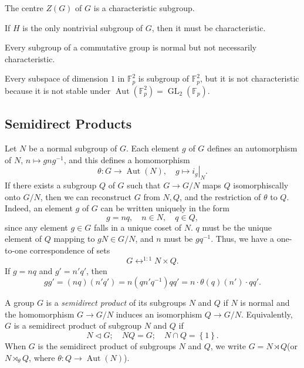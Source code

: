 \begin{example}
  \label{example-centre-is-characteristic}
  The centre \( Z(G) \) of \( G \) is a characteristic subgroup.
\end{example}

\begin{example}
  \label{example-only-nontrivial-is-characteristic}
  If \( H \) is the only nontrivial subgroup of \( G \), then it must be characteristic.
\end{example}

Every subgroup of a commutative group is normal but not necessarily characteristic.
\begin{example}
  \label{example-normal-but-not-characteristic}
  Every subspace of dimension \( 1 \) in \( \mathbb{F}^2_p \) is subgroup of \( \mathbb{F}_p^2 \), but it is not characteristic because it is not stable under \( \operatorname{Aut}(\mathbb{F}^2_p) = \operatorname{GL}_2(\mathbb{F}_p) \).
\end{example}

\subsection{Semidirect Products}
\label{subsection-semidirect-products}

Let \( N \) be a normal subgroup of \( G \).
Each element \( g \) of \( G \) defines an automorphism of \( N \), \( n \mapsto g n g^{-1} \), and this defines a homomorphism
\[
  \theta: G \to \operatorname{Aut}(N),\quad g \mapsto \left. i_g \right\vert_N.
\]
If there exists a subgroup \( Q \) of \( G \) such that \( G \to G / N \) maps \( Q \) isomorphiscally onto \( G / N \), then we can reconstruct \( G \) from \( N, Q \), and the restriction of \( \theta \) to \( Q \).
Indeed, an element \( g \) of \( G \) can be written uniquely in the form
\[
  g = nq,\quad n \in N,\quad q \in Q,
\]
since any element \( g \in G \) falls in a unique coset of \( N \).
\( q \) must be the unique element of \( Q \) mapping to \( gN \in G / N \), and \( n \) must be \( gq^{-1} \).
Thus, we have a one-to-one correspondence of sets
\[
  G \mathop{\longleftrightarrow}^{1:1} N \times Q.
\]
If \( g = nq \) and \( g' = n'q' \), then
\[
  gg' = (nq)(n'q') = n(qn'q^{-1})qq' = n \cdot \theta(q)(n') \cdot qq'.
\]
\begin{definition}
  \label{definition-semidirect-product}
  A group \( G \) is a \emph{semidirect product} of its subgroups \( N \) and \( Q \) if \( N \) is normal and the homomorphism \( G \to G / N \) induces an isomorphism \( Q \to G / N \).
  Equivalently, \( G \) is a semidirect product of subgroup \( N \) and \( Q \) if
  \[
    N \triangleleft G;\quad NQ = G;\quad N \cap Q = \left\lbrace 1 \right\rbrace.
  \]
  When \( G \) is the semidirect product of subgroups \( N \) and \( Q \), we write \( G = N \rtimes Q \)(or \( N \rtimes_\theta Q \), where \( \theta: Q \to \operatorname{Aut}(N) \)).
\end{definition}

